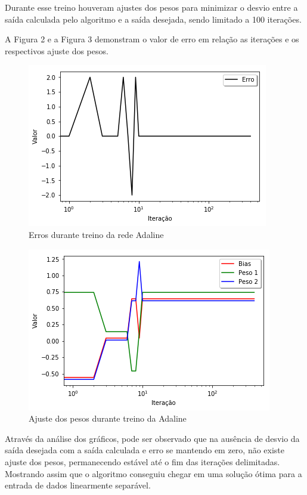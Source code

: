 \documentclass[a4paper,11pt]{article}
\begin{document}
			Durante esse treino houveram ajustes dos pesos para minimizar o desvio entre a saída calculada pelo algoritmo e a saída desejada, sendo limitado a 100 iterações. 
			
			A Figura 2 e a Figura 3 demonstram o valor de erro em relação as iterações e os respectivos ajuste dos pesos.
			
			\begin{figure}[H]
				\centering
				\includegraphics[width=0.7\linewidth]{Figuras/Resultado01}
				\caption[Resultado OR 01]{Erros durante treino da rede Adaline}
				\label{fig:resultado01}
			\end{figure}
			
			\begin{figure}[H]
				\centering
				\includegraphics[width=0.7\linewidth]{Figuras/Resultado02}
				\caption[Resultado OR 02]{Ajuste dos pesos durante treino da Adaline}
				\label{fig:resultado02}
			\end{figure}
		
			Através da análise dos gráficos, pode ser observado que na ausência de desvio da saída desejada com a saída calculada e erro se mantendo em zero, não existe ajuste dos pesos, permanecendo estável até o fim das iterações delimitadas. Mostrando assim que o algoritmo conseguiu chegar em uma solução ótima para a entrada de dados linearmente separável.
		
\end{document}
